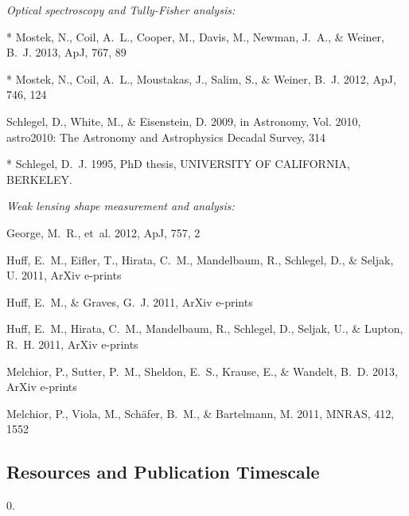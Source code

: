 \documentclass[12pt]{article}
\begin{document}
{\small
\begin{description}
\item \textit{Optical spectroscopy and Tully-Fisher analysis:}
  \begin{description}
  \item {}, N., {Coil}, A.~L., {Cooper}, M., {Davis}, M., {Newman}, J.~A., \&
    {Weiner}, B.~J. 2013, ApJ, 767, 89
  \item {}, N., {Coil}, A.~L., {Moustakas}, J., {Salim}, S., \& {Weiner}, B.~J.
    2012, ApJ, 746, 124
  \item {Schlegel}, D., {White}, M., \& {Eisenstein}, D. 2009, in Astronomy, Vol. 2010,
    astro2010: The Astronomy and Astrophysics Decadal Survey, 314
  \item {}, D.~J. 1995, PhD thesis, UNIVERSITY OF CALIFORNIA, BERKELEY.
  \end{description}
\item \textit{Weak lensing shape measurement and analysis:}
  \begin{description}
  \item {George}, M.~R., {et~al.} 2012, ApJ, 757, 2
  \item {Huff}, E.~M., {Eifler}, T., {Hirata}, C.~M., {Mandelbaum}, R., {Schlegel}, D.,
    \& {Seljak}, U. 2011{}, ArXiv e-prints
  \item {Huff}, E.~M., \& {Graves}, G.~J. 2011, ArXiv e-prints
  \item {Huff}, E.~M., {Hirata}, C.~M., {Mandelbaum}, R., {Schlegel}, D., {Seljak}, U.,
    \& {Lupton}, R.~H. 2011{}, ArXiv e-prints
  \item {Melchior}, P., {Sutter}, P.~M., {Sheldon}, E.~S., {Krause}, E., \& {Wandelt},
    B.~D. 2013, ArXiv e-prints
  \item {Melchior}, P., {Viola}, M., {Sch{\"a}fer}, B.~M., \& {Bartelmann}, M. 2011,
    MNRAS, 412, 1552
  \end{description}
\end{description}
}

\subsection{Resources and Publication Timescale}

\renewcommand{\bibfont}{\footnotesize}
\begin{spacing}{0.}


\end{spacing}
\end{document}

